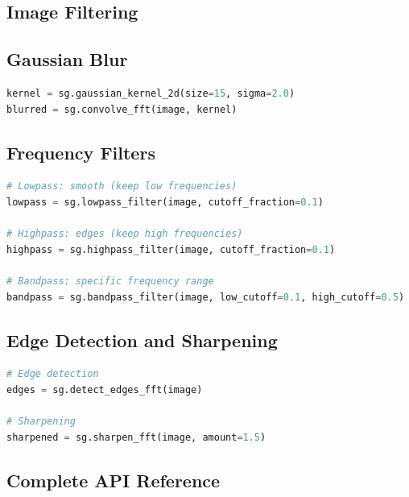 \subsection*{Image Filtering}

\subsection*{Gaussian Blur}

\begin{lstlisting}[language=Python, caption={Gaussian blur via FFT convolution}]
kernel = sg.gaussian_kernel_2d(size=15, sigma=2.0)
blurred = sg.convolve_fft(image, kernel)
\end{lstlisting}

\subsection*{Frequency Filters}

\begin{lstlisting}[language=Python, caption={Low-pass, high-pass, and band-pass image filters}]
# Lowpass: smooth (keep low frequencies)
lowpass = sg.lowpass_filter(image, cutoff_fraction=0.1)

# Highpass: edges (keep high frequencies)
highpass = sg.highpass_filter(image, cutoff_fraction=0.1)

# Bandpass: specific frequency range
bandpass = sg.bandpass_filter(image, low_cutoff=0.1, high_cutoff=0.5)
\end{lstlisting}

\subsection*{Edge Detection and Sharpening}

\begin{lstlisting}[language=Python, caption={FFT-based edge detection and image sharpening}]
# Edge detection
edges = sg.detect_edges_fft(image)

# Sharpening
sharpened = sg.sharpen_fft(image, amount=1.5)
\end{lstlisting}

\subsection*{Complete API Reference}

